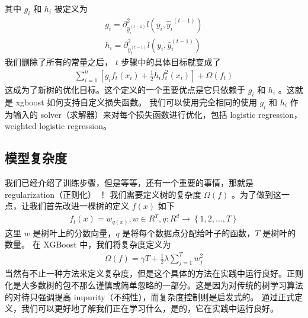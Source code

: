 \documentclass{article}
\begin{document}
其中 $g_i$ 和 $h_i$ 被定义为
\begin{equation*}
	\begin{split}
		g_i = \partial^2_{\hat{y}_i^{(t-1)}}l(y_i,\hat{y_i}^{(t-1)})\\
		h_i = \partial^2_{\hat{y}^{(t-1)}_t}l(y_i,\hat{y}_i^{(t-1)})
	\end{split}
\end{equation*}
我们删除了所有的常量之后， $t$ 步骤中的具体目标就变成了
\begin{equation*}
	\begin{split}
		\sum_{i=1}^n[g_if_t(x_i)+\frac{1}{2}h_if_t^2(x_i)]+\Omega(f_t)
	\end{split}
\end{equation*}
这成为了新树的优化目标。这个定义的一个重要优点是它只依赖于 $g_i$ 和 $h_i$ 。这就是 xgboost 如何支持自定义损失函数。 我们可以使用完全相同的使用 $g_i$ 和 $h_i$ 作为输入的 solver（求解器）来对每个损失函数进行优化，包括 logistic regression， weighted logistic regression。
\subsection{模型复杂度}
我们已经介绍了训练步骤，但是等等，还有一个重要的事情，那就是 regularization（正则化） ！ 我们需要定义树的复杂度 $\Omega(f)$ 。为了做到这一点，让我们首先改进一棵树的定义 $f(x)$ 如下
\begin{equation*}
	\begin{split}
		f_t(x) = w_{q(x)},w\in R^T,q:R^d\rightarrow\left\{1,2,\ldots,T\right\}
	\end{split}
\end{equation*}
这里 $w$ 是树叶上的分数向量，$q$ 是将每个数据点分配给叶子的函数，$T$ 是树叶的数量。 在 XGBoost 中，我们将复杂度定义为
\begin{equation*}
	\begin{split}
		\Omega(f)=\gamma T+\frac{1}{2}\lambda\sum_{j=1}^Tw^2_j 
	\end{split}
\end{equation*}
当然有不止一种方法来定义复杂度，但是这个具体的方法在实践中运行良好。正则化是大多数树的包不那么谨慎或简单忽略的一部分。这是因为对传统的树学习算法的对待只强调提高 impurity（不纯性），而复杂度控制则是启发式的。 通过正式定义，我们可以更好地了解我们正在学习什么，是的，它在实践中运行良好。
\end{document}
